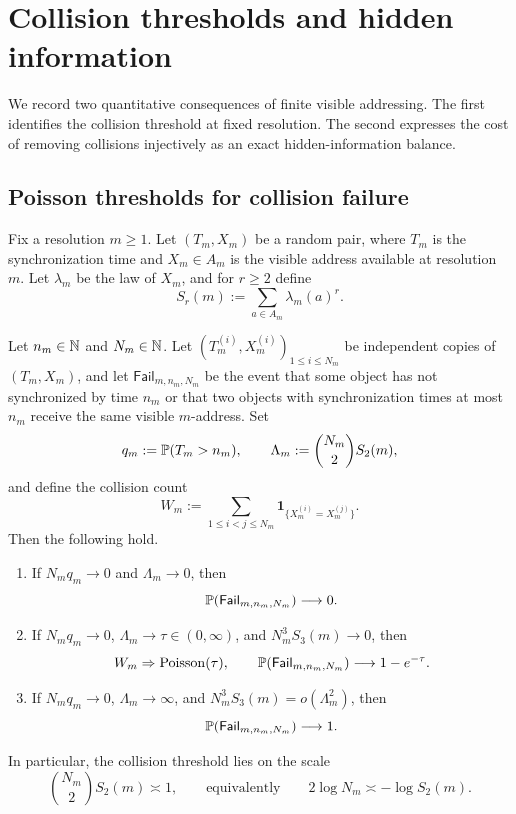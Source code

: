 \section{Collision thresholds and hidden information}\label{sec:double-budget}

We record two quantitative consequences of finite visible addressing.
The first identifies the collision threshold at fixed resolution.  The
second expresses the cost of removing collisions injectively as an exact
hidden-information balance.

\subsection{Poisson thresholds for collision failure}

Fix a resolution \(m\geq 1\).  Let \((T_m,X_m)\) be a random pair,
where \(T_m\) is the synchronization time and \(X_m\in A_m\) is the
visible address available at resolution \(m\).  Let \(\lambda_m\) be the
law of \(X_m\), and for \(r\geq 2\) define
\[
  S_r(m):=\sum_{a\in A_m}\lambda_m(a)^r.
\]

\begin{theorem}
\label{thm:double-budget-poisson}
Let \(n_m\in\mathbb{N}\) and \(N_m\in\mathbb{N}\).  Let
\((T_m^{(i)},X_m^{(i)})_{1\leq i\leq N_m}\) be independent copies of
\((T_m,X_m)\), and let \(\mathsf{Fail}_{m,n_m,N_m}\) be the event that
some object has not synchronized by time \(n_m\) or that two objects
with synchronization times at most \(n_m\) receive the same visible
\(m\)-address.  Set
\[
  q_m:=\mathbb{P}(T_m>n_m),
  \qquad
  \Lambda_m:=\binom{N_m}{2}S_2(m),
\]
and define the collision count
\[
  W_m:=\sum_{1\leq i<j\leq N_m}
       \mathbf{1}_{\{X_m^{(i)}=X_m^{(j)}\}}.
\]
Then the following hold.
\begin{enumerate}[label=(\roman*)]
  \item If \(N_m q_m\to 0\) and \(\Lambda_m\to 0\), then
    \[
      \mathbb{P}(\mathsf{Fail}_{m,n_m,N_m})\longrightarrow 0.
    \]
  \item If \(N_m q_m\to 0\), \(\Lambda_m\to\tau\in(0,\infty)\), and
    \(N_m^3S_3(m)\to 0\), then
    \[
      W_m \Rightarrow \mathrm{Poisson}(\tau),
      \qquad
      \mathbb{P}(\mathsf{Fail}_{m,n_m,N_m})\longrightarrow 1-e^{-\tau}.
    \]
  \item If \(N_m q_m\to 0\), \(\Lambda_m\to\infty\), and
    \(N_m^3S_3(m)=o(\Lambda_m^2)\), then
    \[
      \mathbb{P}(\mathsf{Fail}_{m,n_m,N_m})\longrightarrow 1.
    \]
\end{enumerate}
In particular, the collision threshold lies on the scale
\[
  \binom{N_m}{2}S_2(m)\asymp 1,
  \qquad\text{equivalently}\qquad
  2\log N_m \asymp -\log S_2(m).
\]
\end{theorem}

